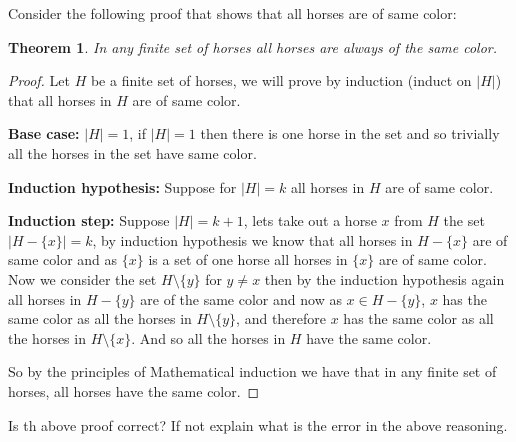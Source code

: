 \documentclass[a4paper]{exam}
\newtheorem{theorem}{Theorem}
\begin{document}
\begin{questions}
  \begin{solution}
  \end{solution}

   Consider the following proof that shows that all horses are of same color:
  \begin{theorem}
      In any finite set of horses all horses are always of the same color.
  \end{theorem}
  \begin{proof}
      Let $H$ be a finite set of horses, we will prove by induction (induct on $|H|$) that all horses in $H$ are of same color. 
      
      \textbf{Base case:} $|H| = 1$, if $|H| = 1$ then there is one horse in the set and so trivially all the horses in the set have same color. 

      \textbf{Induction hypothesis:} Suppose for $|H| = k$ all horses in $H$ are of same color.

      \textbf{Induction step:} Suppose $|H| = k+1$, lets take out a horse $x$ from $H$ the set $|H - \{x\}| = k$, by induction hypothesis we know that all horses in $H - \{x\}$ are of same color and as $\{x\}$ is a set of one horse all horses in $\{x\}$ are of same color. Now we consider the set $H \setminus \{y\}$ for $y \neq x$ then by the induction hypothesis again all horses in $H - \{y\}$ are of the same color and now as $x \in H - \{y\}$, $x$ has the same color as all the horses in $H \setminus \{y\}$, and therefore $x$ has the same color as all the horses in $H \setminus \{x\}$. And so all the horses in $H$ have the same color.

      So by the principles of Mathematical induction we have that in any finite set of horses, all horses have the same color.
  \end{proof}

  Is th above proof correct? If not explain what is the error in the above reasoning.
  \begin{solution}
  \end{solution}


\end{questions}
\end{document}
